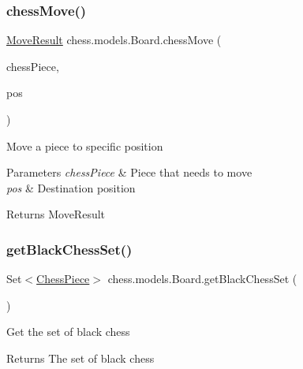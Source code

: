 \subsubsection{\texorpdfstring{chess\+Move()}{chessMove()}}
{\footnotesize\ttfamily \mbox{\hyperlink{enumchess_1_1models_1_1enums_1_1_move_result}{Move\+Result}} chess.\+models.\+Board.\+chess\+Move (\begin{DoxyParamCaption}\item[{\mbox{\hyperlink{classchess_1_1models_1_1_chess_piece}{Chess\+Piece}}}]{chess\+Piece,  }\item[{\mbox{\hyperlink{classchess_1_1models_1_1_position}{Position}}}]{pos }\end{DoxyParamCaption})}

Move a piece to specific position


\begin{DoxyParams}{Parameters}
{\em chess\+Piece} & Piece that needs to move \\
\hline
{\em pos} & Destination position \\
\hline
\end{DoxyParams}
\begin{DoxyReturn}{Returns}
Move\+Result 
\end{DoxyReturn}
\mbox{\label{classchess_1_1models_1_1_board_a4dcc35426fd6ebe9725b2edaa4752310}} 
\subsubsection{\texorpdfstring{get\+Black\+Chess\+Set()}{getBlackChessSet()}}
{\footnotesize\ttfamily Set$<$\mbox{\hyperlink{classchess_1_1models_1_1_chess_piece}{Chess\+Piece}}$>$ chess.\+models.\+Board.\+get\+Black\+Chess\+Set (\begin{DoxyParamCaption}{ }\end{DoxyParamCaption})}

Get the set of black chess

\begin{DoxyReturn}{Returns}
The set of black chess 
\end{DoxyReturn}
\mbox{\label{classchess_1_1models_1_1_board_aa4ce59757096d83c1f8ffe3d97b84190}} 

